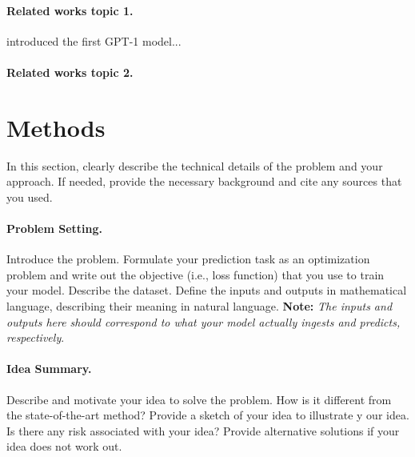 \documentclass{article}
\begin{document}
\paragraph{Related works topic 1.} \citet{radford2018improving} introduced the first GPT-1 model...  %

\paragraph{Related works topic 2.}
% 

\section{Methods}
\label{sec:methods}
In this section, clearly describe the technical details of the problem and your approach. If needed, provide the necessary background and cite any sources that you used.


\paragraph{Problem Setting.}
Introduce the problem. Formulate your prediction task as an optimization problem and write out the objective (i.e., loss function) that you use to train your model. Describe the dataset. Define the inputs and outputs in mathematical language, describing their meaning in natural language. \textbf{Note:} \textit{The inputs and outputs here should correspond to what your model actually ingests and predicts, respectively}. 


\paragraph{Idea Summary.}
Describe and motivate your idea to solve the problem.  How is it different from the state-of-the-art method? Provide a sketch of your idea to illustrate y our idea. Is there any risk associated with your idea? Provide alternative solutions if your idea does not work out.


\end{document}
